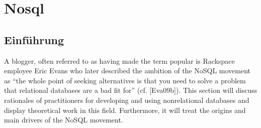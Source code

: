 \documentclass[a4paper,10pt,titlepage=false]{scrreprt}
\begin{document}

\chapter{Nosql}

\section{Einführung} %
\label{sec:einf_hrung}
A blogger, often referred to as having made the term popular is Rackspace employee Eric Evans who later
described the ambition of the NoSQL movement as “the whole point of seeking alternatives is that you
need to solve a problem that relational databases are a bad fit for” (cf. [Eva09b]).
This section will discuss rationales of practitioners for developing and using nonrelational databases and
display theoretical work in this field. Furthermore, it will treat the origins and main drivers of the NoSQL
movement.
\end{document}
